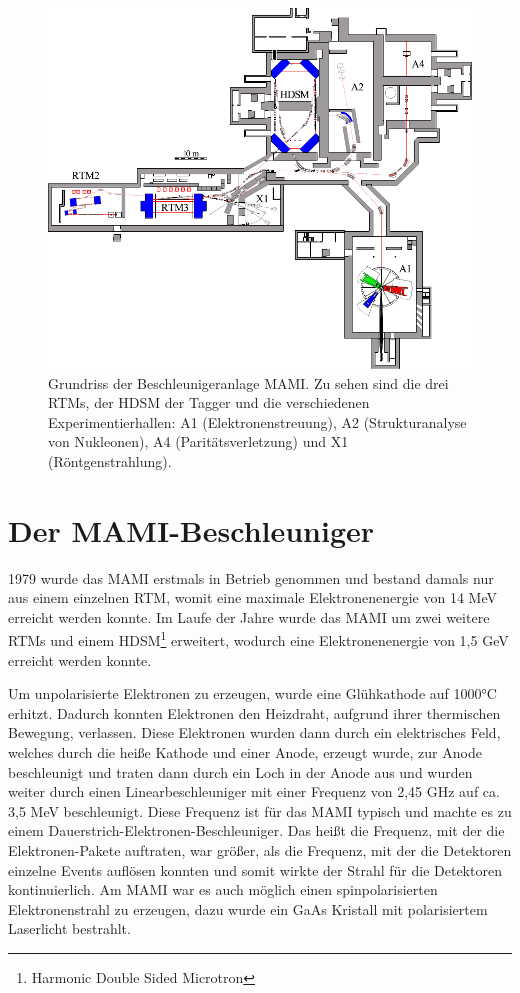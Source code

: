 \documentclass[a4paper,11pt,oneside,final,german,openbib,pdftex]{scrbook}
\begin{document}
{\begin{figure}[h!]
	
	\includegraphics{grundriss}
	\caption{Grundriss der Beschleunigeranlage MAMI. Zu sehen sind die drei RTMs, der HDSM der Tagger und die verschiedenen Experimentierhallen: A1 (Elektronenstreuung), A2 (Strukturanalyse von Nukleonen), A4 (Parit\"atsverletzung) und X1 (R\"ontgenstrahlung). \cite{KPh07}}
	\label{fig.grundriss_anlage}
\end{figure}


\section{Der MAMI-Beschleuniger}
1979 wurde das MAMI erstmals in Betrieb genommen und bestand damals nur aus einem einzelnen RTM, womit eine maximale Elektronenenergie von 14 MeV erreicht werden konnte. 
Im Laufe der Jahre wurde das MAMI um zwei weitere RTMs und einem HDSM\footnote{Harmonic Double Sided Microtron} erweitert, wodurch eine Elektronenenergie von 1,5 GeV erreicht werden konnte.\cite{KPh11G} 
\newline


Um unpolarisierte Elektronen zu erzeugen, wurde eine Glühkathode auf 1000°C erhitzt. Dadurch konnten Elektronen den Heizdraht, aufgrund ihrer thermischen Bewegung, verlassen. Diese Elektronen wurden dann durch ein elektrisches Feld, welches durch die heiße Kathode und einer Anode, erzeugt wurde, zur Anode beschleunigt und traten dann durch ein Loch in der Anode aus und wurden weiter durch einen Linearbeschleuniger mit einer Frequenz von 2,45 GHz auf ca. 3,5 MeV beschleunigt. Diese Frequenz ist für das MAMI typisch und machte es zu einem Dauerstrich-Elektronen-Beschleuniger. Das heißt die Frequenz, mit der die Elektronen-Pakete auftraten, war größer, als die Frequenz, mit der die Detektoren einzelne Events auflösen konnten und somit wirkte der Strahl für die Detektoren kontinuierlich.
Am MAMI war es auch m\"oglich einen spinpolarisierten Elektronenstrahl zu erzeugen, dazu wurde ein GaAs Kristall mit polarisiertem Laserlicht bestrahlt. 

}
\end{document}
